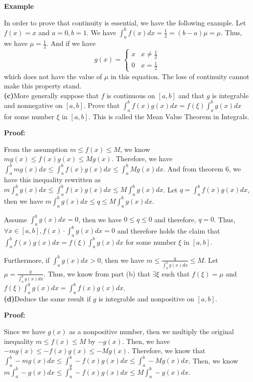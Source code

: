 \documentclass[a4paper,12pt]{report}
\begin{document}
\noindent
\textbf{Example}

\noindent
In order to prove that continuity is essential, we have the following example. Let $f(x)=x$ and $a=0, b=1$. We have $\int_a^bf(x)dx=\frac{1}{2}=(b-a)\mu=\mu$. Thus, we have $\mu = \frac{1}{2}$. And if we have \[g(x)=\begin{cases}
x & x\neq \frac{1}{2}\\
0 &x=\frac{1}{2}
\end{cases}\]
which does not have the value of $\mu$ in this equation. The loss of continuity cannot make this property stand. 
\\

\noindent
\textbf{(c)}More generally suppose that $f$ is continuous on $[a,b]$ and that $g$ is integrable and nonnegative on $[a,b]$. Prove that $\int_a^bf(x)g(x)dx=f(\xi)\int_a^bg(x)dx$ for some number $\xi$ in $[a,b]$. This is called the Mean Value Theorem in Integrals. 

\noindent
\textbf{Proof: }

\noindent
From the assumption $m\leq f(x)\leq M$, we know $mg(x)\leq f(x)g(x)\leq Mg(x)$. Therefore, we have $\int_a^bmg(x)dx\leq  \int_a^bf(x)g(x)dx \leq \int_a^bMg(x)dx$. And from theorem 6, we have this inequality rewritten as $m\int_a^bg(x)dx\leq  \int_a^bf(x)g(x)dx \leq M\int_a^bg(x)dx$. Let $q =\int_a^bf(x)g(x)dx$, then we have $m\int_a^bg(x)dx\leq  q \leq M\int_a^bg(x)dx$.

\noindent
Assume $\int_a^bg(x)dx=0$, then we have $0\leq q\leq 0$ and therefore, $q =0$. Thus, $\forall x \in [a,b], f(x)\cdot\int_a^bg(x)dx=0$ and therefore holds the claim that $\int_a^bf(x)g(x)dx=f(\xi)\int_a^bg(x)dx$ for some number $\xi$ in $[a,b]$.

\noindent
Furthermore, if $\int_a^bg(x)dx>0$, then we have $m\leq \frac{q}{\int_a^bg(x)dx}\leq M$. Let $\mu = \frac{q}{\int_a^bg(x)dx}$. Thus, we know from part (b) that $\exists \xi$ such that $f(\xi)=\mu$ and $f(\xi)\int_a^bg(x)dx=\int_a^bf(x)g(x)dx$.\\

\noindent
\textbf{(d)}Deduce the same result if $g$ is integrable and nonpositive on $[a,b]$.

\noindent
\textbf{Proof: }

\noindent
Since we have $g(x)$ as a nonpositive number, then we multiply the original inequality $m\leq f(x)\leq M$ by $-g(x)$. Then, we have $-mg(x)\leq -f(x)g(x)\leq -Mg(x)$. Therefore, we know that $\int_a^b-mg(x)dx\leq  \int_a^b-f(x)g(x)dx \leq \int_a^b-Mg(x)dx$. Then, we know $m\int_a^b-g(x)dx\leq  \int_a^b-f(x)g(x)dx \leq M\int_a^b-g(x)dx$. 
\end{document}
